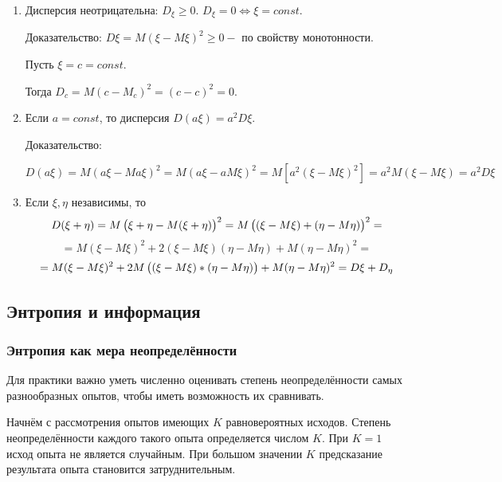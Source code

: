 \documentclass[a4paper,12pt]{report}
\begin{document}
	\begin{enumerate}

	\item	Дисперсия неотрицательна: $D_\xi \ge 0.$ $D_\xi = 0 \Longleftrightarrow \xi = const$. 
		
		Доказательство: $D\xi = M(\xi-M\xi)^2 \ge 0 - $ по свойству монотонности.
		
		Пусть $\xi = c = const$.
		
		Тогда $D_c = M(c-M_c)^2 =(c - c)^2 = 0$.


	\item	Если $a = const$, то дисперсия $D(a\xi) = a^2 D\xi$. 
	
		Доказательство: 
		
		$D(a\xi) = M(a\xi - Ma\xi)^2
		         = M(a\xi - a M\xi)^2
		         = M[a^2 (\xi-M\xi)^2]
		         = a^2 M(\xi - M\xi)
		         = a^2 D\xi
		$
		

	\item	Если $\xi,\eta$ независимы, то 
		$$
		  D(\xi + \eta) = M\left(  \xi \strut + \eta - M(\xi +\eta)    \right)^2 
		                = M\left( (\xi - M\xi) \strut + (\eta - M\eta) \right)^2
		                =
		$$ $$		                
		                = M(\xi - M\xi)^2 + 2(\xi-M\xi)(\eta - M\eta) + M(\eta - M\eta)^2
		                =
		$$ $$
		                = M(\xi - M\xi)^2 + 2M\left( (\xi - M\xi) \strut * (\eta - M\eta)\right) 
		                  + M(\eta - M\eta)^2
		                = D\xi + D_\eta
		$$
	
	\end{enumerate}
	
	
	
	

\subsection{Энтропия и информация}

\subsubsection{Энтропия как мера неопределённости}

	Для практики важно уметь численно оценивать степень неопределённости самых разнообразных опытов, чтобы иметь возможность их сравнивать. 
	
	Начнём с рассмотрения опытов имеющих $K$ равновероятных исходов. Степень неопределённости каждого такого опыта определяется числом $K$. При $K = 1$ исход опыта не является случайным. При большом значении $K$ предсказание результата опыта становится затруднительным.
	
\end{document}

